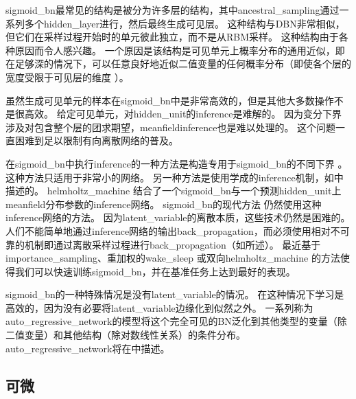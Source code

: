 \gls{sigmoid_bn}最常见的结构是被分为许多层的结构，其中\gls{ancestral_sampling}通过一系列多个\gls{hidden_layer}进行，然后最终生成可见层。
这种结构与\gls{DBN}非常相似，但它们在采样过程开始时的单元彼此独立，而不是从\gls{RBM}采样。
这种结构由于各种原因而令人感兴趣。
一个原因是该结构是可见单元上概率分布的通用近似，即在足够深的情况下，可以任意良好地近似二值变量的任何概率分布（即使各个层的宽度受限于可见层的维度 ）\citep{Sutskever+Hinton-2008}。


虽然生成可见单元的样本在\gls{sigmoid_bn}中是非常高效的，但是其他大多数操作不是很高效。
给定可见单元，对\gls{hidden_unit}的\gls{inference}是难解的。
因为变分下界涉及对包含整个层的团求期望，\gls{meanfield}\gls{inference}也是难以处理的。
这个问题一直困难到足以限制有向离散网络的普及。


在\gls{sigmoid_bn}中执行\gls{inference}的一种方法是构造专用于\gls{sigmoid_bn}的不同下界 \citep{Saul+96}。
这种方法只适用于非常小的网络。
另一种方法是使用学成的\gls{inference}机制，如中描述的。
\gls{helmholtz_machine} \citep{Dayan-et-al-1995,dayan1996varieties} 结合了一个\gls{sigmoid_bn}与一个预测\gls{hidden_unit}上\gls{meanfield}分布参数的\gls{inference}网络。
\gls{sigmoid_bn}的现代方法\citep{Gregor-et-al-ICML2014,Mnih+Gregor-ICML2014} 仍然使用这种\gls{inference}网络的方法。
因为\gls{latent_variable}的离散本质，这些技术仍然是困难的。
人们不能简单地通过\gls{inference}网络的输出\gls{back_propagation}，而必须使用相对不可靠的机制即通过离散采样过程进行\gls{back_propagation}（如所述）。
最近基于\gls{importance_sampling}、重加权的\gls{wake_sleep}\citep{Bornschein+Bengio-ICLR2015-small} 或双向\gls{helmholtz_machine}\citep{Bornschein-et-al-arxiv2015-small} 的方法使得我们可以快速训练\gls{sigmoid_bn}，并在基准任务上达到最好的表现。

\gls{sigmoid_bn}的一种特殊情况是没有\gls{latent_variable}的情况。
在这种情况下学习是高效的，因为没有必要将\gls{latent_variable}边缘化到似然之外。
一系列称为\gls{auto_regressive_network}的模型将这个完全可见的\gls{BN}泛化到其他类型的变量（除二值变量）和其他结构（除对数线性关系）的条件分布。
\gls{auto_regressive_network}将在中描述。


\subsection{可微}
\label{sec:differentiable_generator_networks}

